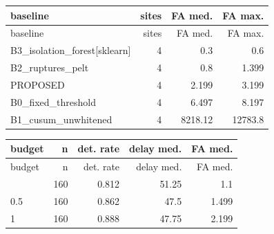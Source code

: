 \documentclass[10pt,a4paper]{article}
\begin{document}
{\small
\setlength{\tabcolsep}{4.5pt}
\setlength{\LTleft}{\fill}
\setlength{\LTright}{\fill}
\begin{longtable}{lrrr}
\toprule
baseline & sites & FA med. & FA max. \\
\midrule
\endfirsthead
\toprule
baseline & sites & FA med. & FA max. \\
\midrule
\endhead
\bottomrule
\endlastfoot
B3\_\allowbreak{}isolation\_\allowbreak{}forest[sklearn] & 4 & 0.3 & 0.6 \\
B2\_\allowbreak{}ruptures\_\allowbreak{}pelt & 4 & 0.8 & 1.399 \\
PROPOSED & 4 & 2.199 & 3.199 \\
B0\_\allowbreak{}fixed\_\allowbreak{}threshold & 4 & 6.497 & 8.197 \\
B1\_\allowbreak{}cusum\_\allowbreak{}unwhitened & 4 & 8218.12 & 12783.8 \\
\end{longtable}
}

{\small
\setlength{\tabcolsep}{4.5pt}
\setlength{\LTleft}{\fill}
\setlength{\LTright}{\fill}
\begin{longtable}{lrrrr}
\toprule
budget & n & det. rate & delay med. & FA med. \\
\midrule
\endfirsthead
\toprule
budget & n & det. rate & delay med. & FA med. \\
\midrule
\endhead
\bottomrule
\endlastfoot
0.1 & 160 & 0.812 & 51.25 & 1.1 \\
0.5 & 160 & 0.862 & 47.5 & 1.499 \\
1 & 160 & 0.888 & 47.75 & 2.199 \\
\end{longtable}
}
\end{document}
